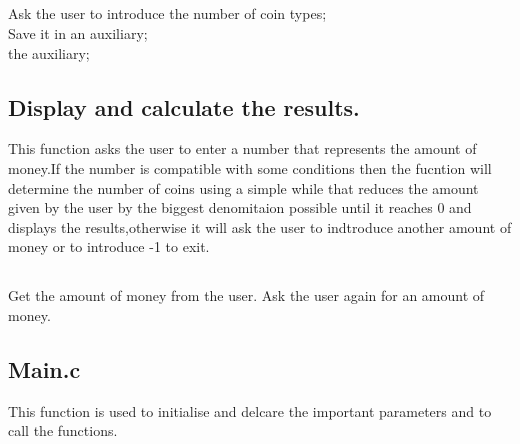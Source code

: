 \documentclass{report}
\begin{document}
\subsection*{}

\begin{algorithm}[H]
    {Ask the user to introduce the number of coin types;}
    \\
    {Save it in an auxiliary;}
    \\
    \Return the auxiliary;
    \caption{Reading the number of coin types.}
\end{algorithm}

\subsection*{Display and calculate the results.}
This function asks the user to enter a number that represents the amount of money.If the number is compatible with some conditions then the fucntion will determine the number of coins using a simple while that reduces the amount given by the user by the biggest denomitaion possible until it reaches 0 and displays the results,otherwise it will ask the user to indtroduce another amount of money or to introduce -1 to exit.
\subsection*{}

\begin{algorithm}[H]
    {Get the amount of money from the user.\;}
     {
         {
        }{
            Ask the user again for an amount of money.\;
        }
    }
    \caption{Display and calculate the results.}
\end{algorithm}

\subsection*{Main.c}
This function is used to initialise and delcare the important parameters and to call the functions.
\end{document}
